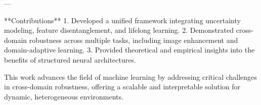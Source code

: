---

**Contributions**  
1. Developed a unified framework integrating uncertainty modeling, feature disentanglement, and lifelong learning.  
2. Demonstrated cross-domain robustness across multiple tasks, including image enhancement and domain-adaptive learning.  
3. Provided theoretical and empirical insights into the benefits of structured neural architectures.  

This work advances the field of machine learning by addressing critical challenges in cross-domain robustness, offering a scalable and interpretable solution for dynamic, heterogeneous environments.  